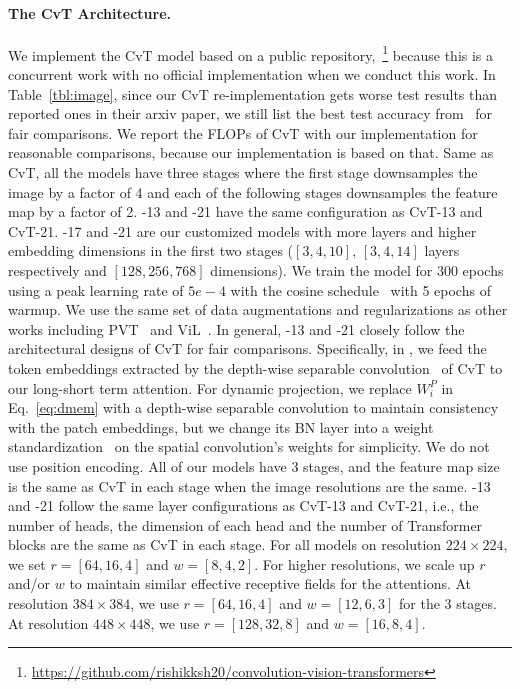 \paragraph{The CvT Architecture.}
We implement the CvT model based on a public repository,~\footnote{\url{https://github.com/rishikksh20/convolution-vision-transformers} }
because {this is a concurrent work with no official implementation when we conduct this work}.
In Table~\ref{tbl:image}, since our CvT re-implementation gets worse test results than reported ones in their arxiv paper, we still list the best test accuracy from~\citet{wu2021cvt} for fair comparisons. 
We report the FLOPs of CvT with our implementation for reasonable comparisons, because our \cvtname{} implementation is based on that.
Same as CvT, all the models have three stages where the first stage downsamples the image by a factor of 4 and each of the following stages downsamples the feature map by a factor of 2. \cvtname{}-13 and \cvtname{}-21 have the same configuration as CvT-13 and CvT-21. \cvtname{}-17 and \cvtname{}-21 are our customized models with more layers and higher embedding dimensions in the first two stages ($[3,4,10]$, $[3,4,14]$ layers respectively and $[128, 256, 768]$ dimensions). 
We train the model for 300 epochs using a peak learning rate of $5e-4$ with the cosine schedule~\citep{loshchilov2016sgdr} with 5 epochs of warmup. We use the same set of data augmentations and regularizations as other works including PVT~\cite{wang2021pyramid} and ViL~\cite{zhang2021visionlongformer}.
In general, \cvtname{}-13 and \cvtname{}-21 closely follow the architectural designs of CvT for fair comparisons. Specifically, in \cvtname{}, we feed the token embeddings extracted by the depth-wise separable convolution~\citep{chollet2017xception} of CvT to our long-short term attention. For dynamic projection, we replace $W_i^P$ in Eq.~\eqref{eq:dmem} with a depth-wise separable convolution to maintain consistency with the patch embeddings, but we change its BN layer into a weight standardization~\citep{huang2017centered,qiao2019ws} on the spatial convolution's weights for simplicity. We do not use position encoding. All of our models have 3 stages, and the feature map size is the same as CvT in each stage when the image resolutions are the same. \cvtname{}-13 and \cvtname{}-21 follow the same layer configurations as CvT-13 and CvT-21, i.e., the number of heads, the dimension of each head and the number of Transformer blocks are the same as CvT in each stage. 
For all models on resolution $224\times 224$, we set $r=[64, 16, 4]$ and $w=[8,4,2]$. For higher resolutions, we scale up $r$ and/or $w$ to maintain similar effective receptive fields for the attentions. At resolution $384\times 384$, we use $r=[64, 16, 4]$ and $w=[12,6,3]$ for the 3 stages. At resolution $448 \times 448$, we use $r=[128, 32, 8]$ and $w=[16,8,4]$.

